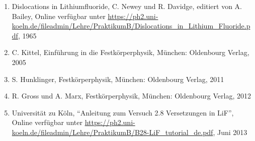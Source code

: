 \documentclass[12pt,a4paper]{scrartcl}
\numberwithin{equation}{section} %
\renewcommand{\[}{} %
\renewcommand{\]}{\noindent} %
\newcommand{\tightlist}{} %
\begin{document}
\begin{enumerate}
\def\labelenumi{\arabic{enumi}.}
\tightlist
\item
  Dislocations in Lithiumfluoride, C. Newey und R. Davidge, editiert von
  A. Bailey, Online verfügbar unter
  \url{https://ph2.uni-koeln.de/fileadmin/Lehre/PraktikumB/Dislocations_in_Lithium_Fluoride.pdf},
  1965
\item
  C. Kittel, Einführung in die Festkörperphysik, München: Oldenbourg
  Verlag, 2005
\item
  S. Hunklinger, Festkörperphysik, München: Oldenbourg Verlag, 2011
\item
  R. Gross und A. Marx, Festkörperphysik, München: Oldenbourg Verlag,
  2012
\item
  Universität zu Köln, ``Anleitung zum Versuch 2.8 Versetzungen in
  LiF'', Online verfügbar unter
  \url{https://ph2.uni-koeln.de/fileadmin/Lehre/PraktikumB/B28-LiF_tutorial_de.pdf},
  Juni 2013
\end{enumerate}
\end{document}
